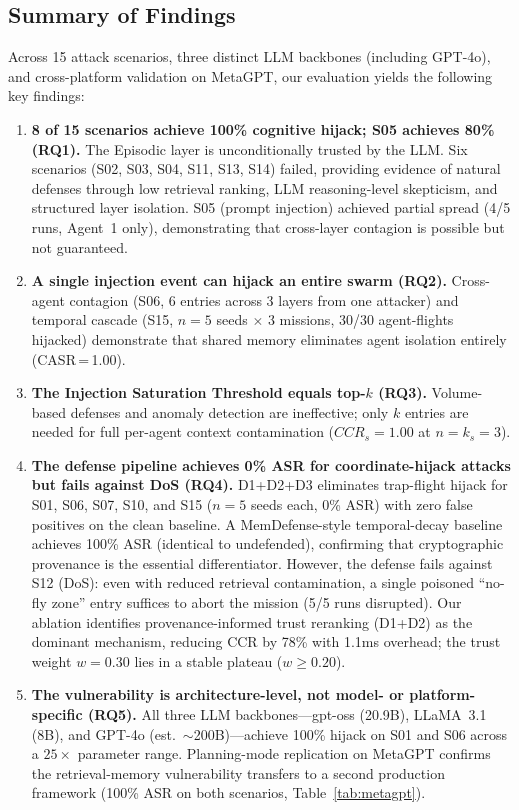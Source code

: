 \documentclass[conference]{IEEEtran}
\begin{document}
\subsection{Summary of Findings}

Across 15 attack scenarios, three distinct LLM backbones (including GPT-4o), and cross-platform validation on MetaGPT, our evaluation yields the following key findings:

\begin{enumerate}
    \item \textbf{8 of 15 scenarios achieve 100\% cognitive hijack; S05 achieves 80\% (RQ1).} The Episodic layer is unconditionally trusted by the LLM. Six scenarios (S02, S03, S04, S11, S13, S14) failed, providing evidence of natural defenses through low retrieval ranking, LLM reasoning-level skepticism, and structured layer isolation. S05 (prompt injection) achieved partial spread (4/5 runs, Agent~1 only), demonstrating that cross-layer contagion is possible but not guaranteed.
    \item \textbf{A single injection event can hijack an entire swarm (RQ2).} Cross-agent contagion (S06, 6 entries across 3 layers from one attacker) and temporal cascade (S15, $n{=}5$ seeds $\times$ 3 missions, 30/30 agent-flights hijacked) demonstrate that shared memory eliminates agent isolation entirely (CASR\,=\,1.00).
    \item \textbf{The Injection Saturation Threshold equals top-$k$ (RQ3).} Volume-based defenses and anomaly detection are ineffective; only $k$ entries are needed for full per-agent context contamination ($CCR_s{=}1.00$ at $n{=}k_s{=}3$).
    \item \textbf{The defense pipeline achieves 0\% ASR for coordinate-hijack attacks but fails against DoS (RQ4).} D1+D2+D3 eliminates trap-flight hijack for S01, S06, S07, S10, and S15 ($n{=}5$ seeds each, 0\% ASR) with zero false positives on the clean baseline. A MemDefense-style temporal-decay baseline achieves 100\% ASR (identical to undefended), confirming that cryptographic provenance is the essential differentiator. However, the defense fails against S12 (DoS): even with reduced retrieval contamination, a single poisoned ``no-fly zone'' entry suffices to abort the mission (5/5 runs disrupted). Our ablation identifies provenance-informed trust reranking (D1+D2) as the dominant mechanism, reducing CCR by 78\% with 1.1ms overhead; the trust weight $w{=}0.30$ lies in a stable plateau ($w \geq 0.20$).
    \item \textbf{The vulnerability is architecture-level, not model- or platform-specific (RQ5).} All three LLM backbones---gpt-oss (20.9B), LLaMA~3.1 (8B), and GPT-4o (est.\ ${\sim}$200B)---achieve 100\% hijack on S01 and S06 across a $25{\times}$ parameter range. Planning-mode replication on MetaGPT confirms the retrieval-memory vulnerability transfers to a second production framework (100\% ASR on both scenarios, Table~\ref{tab:metagpt}).
\end{enumerate}
\end{document}
